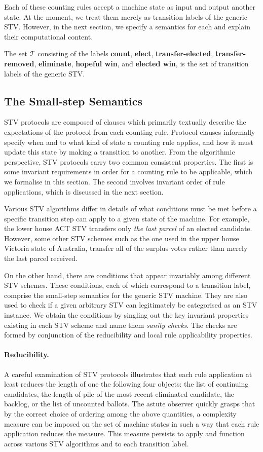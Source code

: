 \documentclass{llncs}
\begin{document}
Each of these counting rules accept a machine state as input and output another state. At the moment, we treat them merely as transition labels of the generic STV. However, in the next section, we specify a semantics for each and explain their computational content.
\begin{definition}\label{stv:trans}
The set $\mathcal{T}$ consisting of the labels \textbf{count}, \textbf{elect}, \textbf{transfer-elected}, \textbf{transfer-removed}, \textbf{eliminate}, \textbf{hopeful win}, and \textbf{elected win}, is the set of transition labels of the generic STV.
\end{definition}
\subsection{The Small-step Semantics}
STV protocols are composed of clauses which primarily textually describe the expectations of the protocol from each counting rule. Protocol clauses informally specify when and to what kind of state a counting rule applies, and how it must update this state by making a transition to another. From the algorithmic perspective, STV protocols carry two common   consistent properties. The first is some invariant requirements in order for a counting rule to be applicable, which we formalise in this section. The second involves invariant order of rule applications, which is discussed in the next section. 


Various STV algorithms differ in details of what conditions must be met before a specific transition step can apply to a given state of the machine. For example, the lower house ACT STV transfers only \emph{the last parcel} of an elected candidate. However, some other STV schemes such as the one used in the upper house Victoria state of Australia,   transfer all of the surplus votes rather than merely the last parcel received. 


On the other hand, there are conditions that appear invariably among different STV schemes. These conditions, each of which correspond to a transition label, comprise the small-step semantics for the generic STV machine. They are also used to check if a given arbitrary STV can legitimately be categorised as an STV instance. We obtain the conditions by singling out the key invariant properties existing in each STV scheme and name them \emph{sanity checks}. The checks are formed by conjunction of the reducibility and local rule applicability properties.
\paragraph{Reducibility.} 
A careful examination of STV protocols illustrates that each rule application at least reduces the length of one the following four objects: the list of continuing candidates, the length of pile of the most recent eliminated candidate,  the backlog, or the list of uncounted ballots. The astute observer quickly grasps that by the correct choice of ordering among the above quantities, a complexity measure can be imposed on the set of machine states in such a way that each rule application reduces the measure. This measure persists to apply and function across various STV algorithms and to each transition label.     
\end{document}
